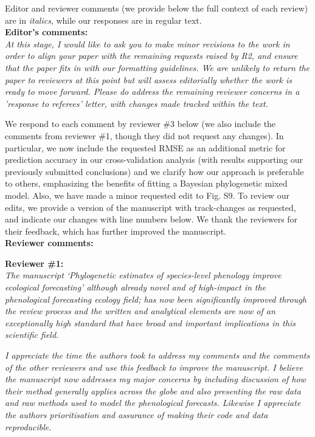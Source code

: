 \documentclass[11pt]{article}
\begin{document}
Editor and reviewer comments (we provide below the full context of each review) are in \emph{italics}, while our responses are in regular text. 
\\ %

{\bf Editor's comments:} \\


\emph{At this stage, I would like to ask you to make minor revisions to the work in order to align your paper with the remaining requests raised by R2, and ensure that the paper fits in with our formatting guidelines. We are unlikely to return the paper to reviewers at this point but will assess editorially whether the work is ready to move forward. Please do address the remaining reviewer concerns in a 'response to referees' letter, with changes made tracked within the text.}

We respond to each comment by reviewer \#3 below (we also include the comments from reviewer \#1, though they did not request any changes). In particular, we now include the requested RMSE as an additional metric for prediction accuracy in our cross-validation analysis (with results supporting our previously submitted conclusions) and we clarify how our approach is preferable to others, emphasizing the benefits of fitting a Bayesian phylogenetic mixed model. Also, we have made a minor requested edit to Fig. S9. To review our edits, we provide a version of the manuscript with track-changes as requested, and indicate our changes with line numbers below. We thank the reviewers for their feedback, which has further improved the manuscript.\\

{\bf Reviewer comments:} 

{\bf Reviewer \#1:}\\

\emph{The manuscript ‘Phylogenetic estimates of species-level phenology improve ecological forecasting’ although already novel and of high-impact in the phenological forecasting ecology field; has now been significantly improved through the review process and the written and analytical elements are now of an exceptionally high standard that have broad and important implications in this scientific field.}

\emph{I appreciate the time the authors took to address my comments and the comments of the other reviewers and use this feedback to improve the manuscript. I believe the manuscript now addresses my major concerns by including discussion of how their method generally applies across the globe and also presenting the raw data and raw methods used to model the phenological forecasts. Likewise I appreciate the authors prioritisation and assurance of making their code and data reproducible.}
\end{document}
